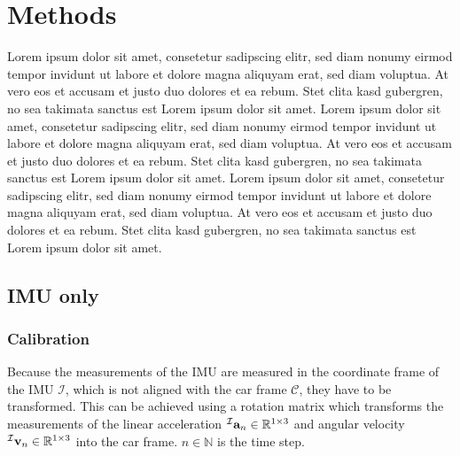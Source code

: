\chapter{Methods}
\label{ch:Methods}
Lorem ipsum dolor sit amet, consetetur sadipscing elitr, sed diam nonumy eirmod tempor invidunt ut labore et dolore magna aliquyam erat, sed diam voluptua.
At vero eos et accusam et justo duo dolores et ea rebum. Stet clita kasd gubergren, no sea takimata sanctus est Lorem ipsum dolor sit amet.
Lorem ipsum dolor sit amet, consetetur sadipscing elitr, sed diam nonumy eirmod tempor invidunt ut labore et dolore magna aliquyam erat, sed diam voluptua.
At vero eos et accusam et justo duo dolores et ea rebum. Stet clita kasd gubergren, no sea takimata sanctus est Lorem ipsum dolor sit amet.
Lorem ipsum dolor sit amet, consetetur sadipscing elitr, sed diam nonumy eirmod tempor invidunt ut labore et dolore magna aliquyam erat, sed diam voluptua.
At vero eos et accusam et justo duo dolores et ea rebum. Stet clita kasd gubergren, no sea takimata sanctus est Lorem ipsum dolor sit amet.

\section{IMU only}
\subsection{Calibration}
Because the measurements of the IMU are measured in the coordinate frame of the IMU $\mathcal{I}$, which is not aligned with the car frame $\mathcal{C}$, they have to be transformed.
This can be achieved using a rotation matrix  which transforms the measurements of the linear acceleration $\vincs{a}{I}_n \in \mathbb{R}^{1\times3}$ and angular velocity ${\vincs{v}{I}_n \in \mathbb{R}^{1\times3}}$ into the car frame. $n \in \mathbb{N}$ is the time step.

